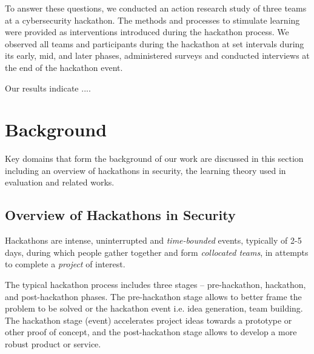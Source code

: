 \documentclass[runningheads]{llncs}
\begin{document}
To answer these questions, we conducted an action research study of three teams at a cybersecurity hackathon. The methods and processes to stimulate learning were provided as interventions introduced during the hackathon process. We observed all teams and participants during the hackathon at set intervals during its early, mid, and later phases, administered surveys and conducted interviews at the end of the hackathon event.

Our results indicate ....

\section{Background}
Key domains that form the background of our work are discussed in this section including an overview of hackathons in security, the learning theory used in evaluation and related works.

\subsection{Overview of Hackathons in Security}

Hackathons are intense, uninterrupted and \textit{time-bounded} events, typically of 2-5 days, during which people gather together and form \textit{collocated teams}, in attempts to complete a \textit{project} of interest\cite{nolte2018you,komssi2014hackathons}.

The typical hackathon process \cite{komssi2014hackathons} includes three stages -- pre-hackathon, hackathon, and post-hackathon phases. The pre-hackathon stage allows to better frame the problem to be solved or the hackathon event i.e. idea generation, team building. The hackathon stage (event) accelerates project ideas towards a prototype or other proof of concept, and the post-hackathon stage allows to develop a more robust product or service.
\end{document}
